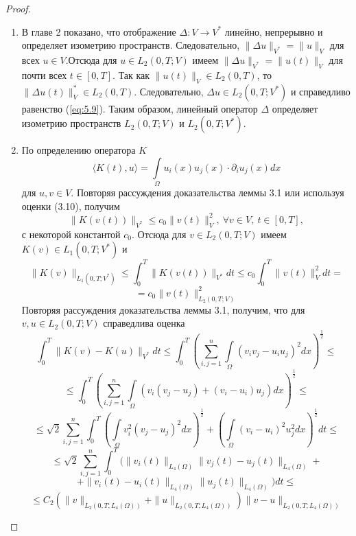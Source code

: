 \begin{proof} ~\\
    \begin{enumerate} 
        \item В главе 2 показано, что отображение $\Delta: V \rightarrow V^\ast$ линейно, непрерывно и определяет изометрию пространств.
        Следовательно, \linebreak $\parallel \Delta u \parallel_{V^\ast} = \parallel u \parallel_V$ для всех $u \in V$.Отсюда для $u \in L_2(0, T; V)$ имеем
        \linebreak $\parallel \Delta u \parallel_{V^\ast} = \parallel u(t) \parallel_V$ для почти всех $t \in [0, T]$. Так как $\parallel u(t) \parallel_V \in L_2(0, T)$,
        то $\parallel \Delta u(t)\parallel_V^\ast \in L_2(0, T)$. Следовательно, $\Delta u \in L_2(0, T; V^\ast)$ и справедливо
        равенство (\ref{eq:5.9}). Таким образом, линейный оператор $\Delta$ определяет изометрию пространств $L_2(0, T; V)$ и $L_2(0, T; V^\ast)$.
        \item По определению оператора $K$
        $$\langle K(t), u \rangle = \int\limits_\Omega u_i(x )u_j(x) \cdot \partial_i u_j(x) dx$$
        для $u, v \in V$. Повторяя рассуждения доказательства леммы 3.1 или используя оценки (3.10), получим
        $$\parallel K(v(t)) \parallel_{V^\ast} \le c_0 \parallel v(t) \parallel^2_V, \ \forall v \in V, \ t \in [0, T],$$
        с некоторой константой $c_0$.
        Отсюда для $v \in L_2(0, T; V)$ имеем $K(v) \in L_1(0, T; V^\ast)$ и
        $$\parallel K(v)\parallel_{L_1(0,T;V^*)}\le\int_0^T\parallel K(v(t))\parallel_{V^*}dt\le c_0\int_0^T\parallel v(t)\parallel_V^2dt=$$
        $$=c_0\parallel v(t)\parallel_{L_2(0,T;V)}^2$$
        Повторяя рассуждения доказательства леммы 3.1, получим, что для $v, u \in L_2(0, T; V)$ справедлива оценка
        $$\int_0^T \parallel K(v)-K(u)\parallel_{V^*}dt\le\int_0^T (\sum_{i,j=1}^n\int\limits_\Omega (v_iv_j-u_iu_j)^2dx)^\frac{1}{2}\le$$
        $$\le\int_0^T(\sum_{i,j=1}^n\int\limits_\Omega (v_i(v_j-u_j)+(v_i-u_i)u_j)dx)^\frac{1}{2}\le$$
        $$\le\sqrt{2}\sum_{i,j=1}^n\int_0^T(\int\limits_\Omega v_i^2(v_j-u_j)^2dx)^\frac{1}{2}+(\int\limits_\Omega(v_i-u_i)^2u_j^2dx)^\frac{1}{2}dt\le$$
        $$\le\sqrt{2}\sum_{i,j=1}^n\int_0^T(\parallel v_i(t)\parallel_{L_4(\Omega)}\parallel v_j(t)-u_j(t)\parallel_{L_4(\Omega)}+$$
        $$+\parallel v_i(t)- u_i(t)\parallel_{L_4(\Omega)}\parallel u_j(t)\parallel_{L_4(\Omega)})dt\le$$
        $$\le C_2(\parallel v \parallel_{L_2(0,T;L_4(\Omega))}+\parallel u \parallel_{L_2(0,T;L_4(\Omega))})\parallel v-u\parallel_{L_2(0,T;L_4(\Omega))}$$

\end{enumerate}
\end{proof}
